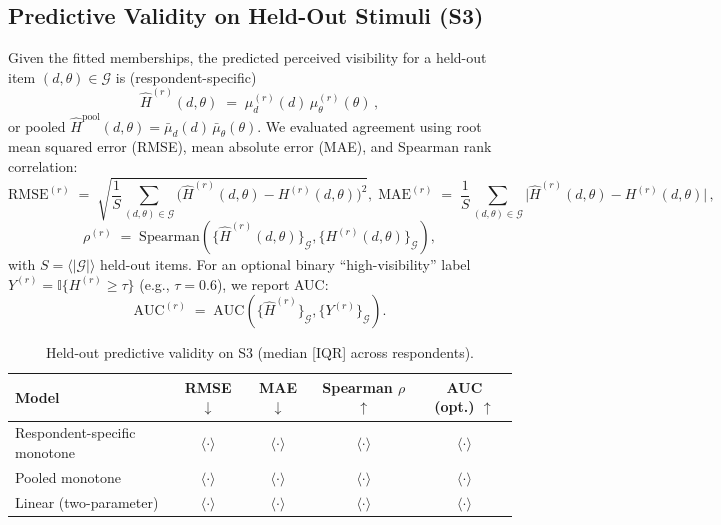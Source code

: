 \documentclass[final,3p,times,review]{elsarticle}
\begin{document}
\subsection{Predictive Validity on Held-Out Stimuli (S3)}
Given the fitted memberships, the predicted perceived visibility for a held-out item $(d,\theta)\in\mathcal{G}$ is (respondent-specific)
\begin{equation}
\widehat{H}^{(r)}(d,\theta) \;=\; \mu^{(r)}_d(d)\,\mu^{(r)}_\theta(\theta)\,,
\label{eq:hhat}
\end{equation}
or pooled $\widehat{H}^{\mathrm{pool}}(d,\theta)=\bar{\mu}_d(d)\,\bar{\mu}_\theta(\theta)$. We evaluated agreement using root mean squared error (RMSE), mean absolute error (MAE), and Spearman rank correlation:
\begin{equation}
\mathrm{RMSE}^{(r)} \;=\; \sqrt{\frac{1}{S}\sum_{(d,\theta)\in \mathcal{G}}
\big(\widehat{H}^{(r)}(d,\theta)-H^{(r)}(d,\theta)\big)^2}, \;
\mathrm{MAE}^{(r)} \;=\; \frac{1}{S}\sum_{(d,\theta)\in \mathcal{G}}
\big|\widehat{H}^{(r)}(d,\theta)-H^{(r)}(d,\theta)\big|\,,
\label{eq:rmse-mae}
\end{equation}
\begin{equation}
\rho^{(r)} \;=\; \mathrm{Spearman}\!\left(
\{\widehat{H}^{(r)}(d,\theta)\}_{\mathcal{G}},
\{H^{(r)}(d,\theta)\}_{\mathcal{G}}
\right),
\label{eq:spearman}
\end{equation}
with $S{=}\langle |\mathcal{G}|\rangle$ held-out items. For an optional binary “high-visibility” label $Y^{(r)}=\mathbb{I}\{H^{(r)}\ge\tau\}$ (e.g., $\tau{=}0.6$), we report AUC:
\begin{equation}
\mathrm{AUC}^{(r)} \;=\; \mathrm{AUC}\!\left(\{\widehat{H}^{(r)}\}_{\mathcal{G}}, \{Y^{(r)}\}_{\mathcal{G}}\right).
\label{eq:auc}
\end{equation}

\begin{table}[H]
\centering
\caption{Held-out predictive validity on S3 (median [IQR] across respondents).}
\label{tab:heldout}
\begin{tabular}{@{}lcccc@{}}
\toprule
Model & RMSE $\downarrow$ & MAE $\downarrow$ & Spearman $\rho$ $\uparrow$ & AUC (opt.) $\uparrow$ \\
\midrule
Respondent-specific monotone & $\langle \cdot \rangle$ & $\langle \cdot \rangle$ & $\langle \cdot \rangle$ & $\langle \cdot \rangle$ \\
Pooled monotone & $\langle \cdot \rangle$ & $\langle \cdot \rangle$ & $\langle \cdot \rangle$ & $\langle \cdot \rangle$ \\
Linear (two-parameter) & $\langle \cdot \rangle$ & $\langle \cdot \rangle$ & $\langle \cdot \rangle$ & $\langle \cdot \rangle$ \\
\bottomrule
\end{tabular}
\end{table}
\end{document}
